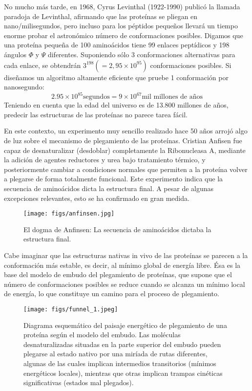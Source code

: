 No mucho más tarde, en 1968, Cyrus Levinthal (1922-1990) publicó la llamada paradoja de Levinthal, afirmando que las proteínas se pliegan en nano/milisegundos, pero incluso para los péptidos pequeños llevará un tiempo enorme probar el astronómico número de conformaciones posibles. Digamos que una proteína pequeña de 100 aminoácidos tiene 99 enlaces peptídicos y 198 ángulos $\Phi$ y $\Psi$ diferentes. Suponiendo sólo 3 conformaciones alternativas para cada enlace, se obtendrán $3^{198} (= 2,95 \times 10^{95})$ conformaciones posibles. Si diseñamos un algoritmo altamente eficiente que pruebe 1 conformación por nanosegundo:
$$2.95 \times 10^{85} \text{segundos} = 9 \times 10^{67} \text{mil millones de años}$$
Teniendo en cuenta que la edad del universo es de 13.800 millones de años, predecir las estructuras de las proteínas no parece tarea fácil.

En este contexto, un experimento muy sencillo realizado hace 50 años arrojó algo de luz sobre el mecanismo de plegamiento de las proteínas. Cristian Anfisen fue capaz de desnaturalizar (desdoblar) completamente la Ribonucleasa A, mediante la adición de agentes reductores y urea bajo tratamiento térmico, y posteriormente cambiar a condiciones normales que permiten a la proteína volver a plegarse de forma totalmente funcional. Este experimento indica que la secuencia de aminoácidos dicta la estructura final. A pesar de algunas excepciones relevantes, esto se ha confirmado en gran medida.
\begin{figure}[h]
\centering
\texttt{[image: figs/anfinsen.jpg]}
\caption{El dogma de Anfinsen: La secuencia de aminoácidos dictaba la estructura final. }
\end{figure}

Cabe imaginar que las estructuras nativas in vivo de las proteínas se parecen a la conformación más estable, es decir, al mínimo global de energía libre. Ésa es la base del modelo de embudo del plegamiento de proteínas, que supone que el número de conformaciones posibles se reduce cuando se alcanza un mínimo local de energía, lo que constituye un camino para el proceso de plegamiento.
\begin{figure}[h]
\centering
\texttt{[image: figs/funnel\_1.jpeg]}
\caption{Diagrama esquemático del paisaje energético de plegamiento de una proteína según el modelo del embudo. Las moléculas desnaturalizadas situadas en la parte superior del embudo pueden plegarse al estado nativo por una miríada de rutas diferentes, algunas de las cuales implican intermedios transitorios (mínimos energéticos locales), mientras que otras implican trampas cinéticas significativas (estados mal plegados).}
\end{figure}

